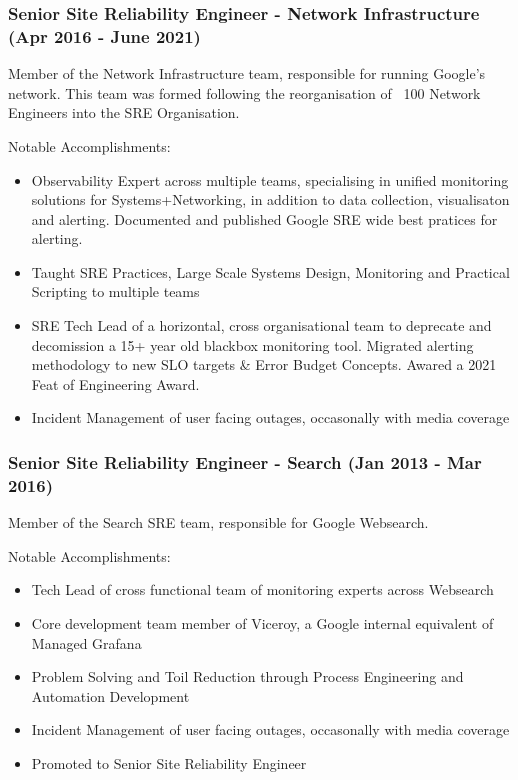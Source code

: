 \documentclass[a4paper, 10pt] {article}
\begin{document}
\subsubsection*{Senior Site Reliability Engineer - Network Infrastructure (Apr 2016 - June 2021)}

Member of the Network Infrastructure team, responsible for running Google's network. This team was formed
following the reorganisation of ~100 Network Engineers into the SRE Organisation.

\vspace{4mm}  %

Notable Accomplishments:

\begin{itemize}[itemsep=2pt,parsep=2pt]
  \item Observability Expert across multiple teams, specialising in unified monitoring solutions for Systems+Networking, in addition to data collection, visualisaton and alerting.
  Documented and published Google SRE wide best pratices for alerting.
  \item Taught SRE Practices, Large Scale Systems Design, Monitoring and Practical Scripting to multiple teams
  \item SRE Tech Lead of a horizontal, cross organisational team to deprecate and decomission a 15+ year old blackbox monitoring tool.
  Migrated alerting methodology to new SLO targets \& Error Budget Concepts. Awared a 2021 Feat of Engineering Award.
  \item Incident Management of user facing outages, occasonally with media coverage
\end{itemize}

\subsubsection*{Senior Site Reliability Engineer - Search (Jan 2013 - Mar 2016)}

Member of the Search SRE team, responsible for Google Websearch.

\vspace{4mm}  %

Notable Accomplishments:

\begin{itemize}[itemsep=2pt,parsep=2pt]
  \item Tech Lead of cross functional team of monitoring experts across Websearch
  \item Core development team member of Viceroy, a Google internal equivalent of Managed Grafana
  \item Problem Solving and Toil Reduction through Process Engineering and Automation Development
  \item Incident Management of user facing outages, occasonally with media coverage
  \item Promoted to Senior Site Reliability Engineer
\end{itemize}
\end{document}
